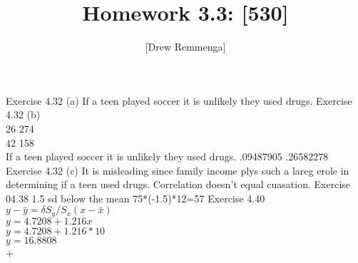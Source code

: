 \documentclass[10pt, oneside]{article}
\title{Homework 3.3: [530]}
\author{[Drew Remmenga]}
\begin{document}
\maketitle
\pagebreak
Exercise 4.32 (a)
If a teen played soccer it is unlikely they used drugs.
\clearpage
Exercise 4.32 (b)
\\
26 274 \\
42 158 \\
If a teen played soccer it is unlikely they used drugs.
.09487905 
.26582278
\clearpage
Exercise 4.32 (c)
It is misleading since family income plys such a lareg erole in determining if a teen used drugs. Correlation doesn't equal cuasation. 
\clearpage
Exercise 04.38 
1.5 sd below the mean
75*(-1.5)*12=57
\clearpage
Exercise 4.40\\
$y -\bar{y} = \delta S_{y}/S_{x} (x-\bar{x})$\\
$y=4.7208+1.216x$\\
$y=4.7208+1.216*10$\\
$y=16.8808$\\
+
\end{document}
